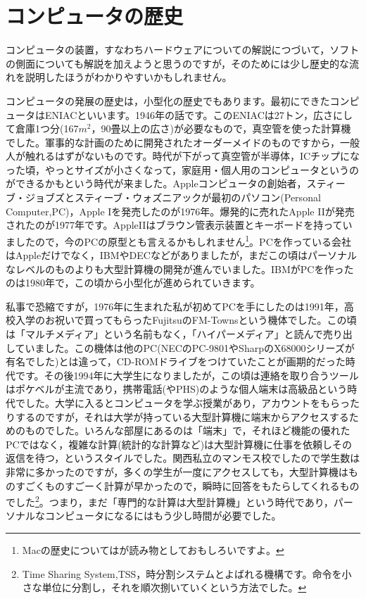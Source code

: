 \documentclass{ltjsbook}
\begin{document}
\section{コンピュータの歴史}
コンピュータの装置，すなわちハードウェアについての解説につづいて，ソフトの側面についても解説を加えようと思うのですが，そのためには少し歴史的な流れを説明したほうがわかりやすいかもしれません。

コンピュータの発展の歴史は，小型化の歴史でもあります。最初にできたコンピュータはENIACといいます。1946年の話です。このENIACは27トン，広さにして倉庫1つ分(167$m^2$，90畳以上の広さ)が必要なもので，真空管を使った計算機でした。軍事的な計画のために開発されたオーダーメイドのものですから，一般人が触れるはずがないものです。時代が下がって真空管が半導体，ICチップになった頃，やっとサイズが小さくなって，家庭用・個人用のコンピュータというのができるかもという時代が来ました。Appleコンピュータの創始者，スティーブ・ジョブズとスティーブ・ウォズニアックが最初のパソコン(Personal Computer,PC)，Apple Iを発売したのが1976年。爆発的に売れたApple IIが発売されたのが1977年です。AppleIIはブラウン管表示装置とキーボードを持っていましたので，今のPCの原型とも言えるかもしれません\footnote{Macの歴史については\citet{アイザックソン2012}が読み物としておもしろいですよ。}。PCを作っている会社はAppleだけでなく，IBMやDECなどがありましたが，まだこの頃はパーソナルなレベルのものよりも大型計算機の開発が進んでいました。IBMがPCを作ったのは1980年で，この頃から小型化が進められていきます。

私事で恐縮ですが，1976年に生まれた私が初めてPCを手にしたのは1991年，高校入学のお祝いで買ってもらったFujitsuのFM-Townsという機体でした。この頃は「マルチメディア」という名前もなく，「ハイパーメディア」と読んで売り出していました。この機体は他のPC(NECのPC-9801やSharpのX68000シリーズが有名でした)とは違って，CD-ROMドライブをつけていたことが画期的だった時代です。その後1994年に大学生になりましたが，この頃は連絡を取り合うツールはポケベルが主流であり，携帯電話(やPHS)のような個人端末は高級品という時代でした。大学に入るとコンピュータを学ぶ授業があり，アカウントをもらったりするのですが，それは大学が持っている大型計算機に端末からアクセスするためのものでした。いろんな部屋にあるのは「端末」で，それほど機能の優れたPCではなく，複雑な計算(統計的な計算など)は大型計算機に仕事を依頼しその返信を待つ，というスタイルでした。関西私立のマンモス校でしたので学生数は非常に多かったのですが，多くの学生が一度にアクセスしても，大型計算機はものすごくものすごーく計算が早かったので，瞬時に回答をもたらしてくれるものでした\footnote{Time Sharing System,TSS，時分割システムとよばれる機構です。命令を小さな単位に分割し，それを順次捌いていくという方法でした。}。つまり，まだ「専門的な計算は大型計算機」という時代であり，パーソナルなコンピュータになるにはもう少し時間が必要でした。
\end{document}
